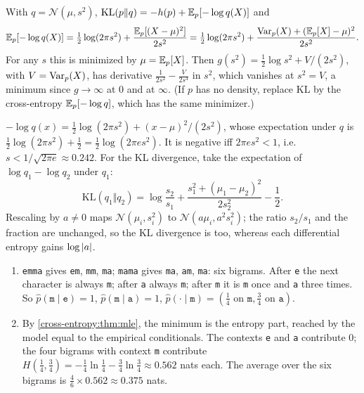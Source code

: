 With $q = \mathcal N(\mu, s^2)$, $\mathrm{KL}(p\Vert q) = -h(p) + \mathbb{E}_p[-\log q(X)]$ and
\[
  \mathbb{E}_p[-\log q(X)] = \tfrac12\log(2\pi s^2) + \frac{\mathbb{E}_p[(X - \mu)^2]}{2s^2}
  = \tfrac12\log(2\pi s^2) + \frac{\operatorname{Var}_p(X) + (\mathbb{E}_p[X] - \mu)^2}{2s^2}.
\]
For any $s$ this is minimized by $\mu = \mathbb{E}_p[X]$. Then $g(s^2) = \frac12\log s^2 + V/(2s^2)$, with $V = \operatorname{Var}_p(X)$, has
derivative $\frac1{2s^2} - \frac V{2s^4}$ in $s^2$, which vanishes at $s^2 = V$, a minimum since $g\to\infty$ at $0$ and
at $\infty$. (If $p$ has no density, replace $\mathrm{KL}$ by the cross-entropy $\mathbb{E}_p[-\log q]$, which has the
same minimizer.)

$-\log q(x) = \frac12\log(2\pi s^2) + (x - \mu)^2/(2s^2)$, whose expectation under $q$ is
$\frac12\log(2\pi s^2) + \frac12 = \frac12\log(2\pi es^2)$. It is negative iff $2\pi es^2<1$, i.e.\
$s<1/\sqrt{2\pi e}\approx0.242$. For the KL divergence, take the expectation of
$\log q_1 - \log q_2$ under $q_1$:
\[
  \mathrm{KL}(q_1\Vert q_2) = \log\frac{s_2}{s_1} + \frac{s_1^2 + (\mu_1 - \mu_2)^2}{2s_2^2} - \frac12 .
\]
Rescaling by $a\neq0$ maps $\mathcal N(\mu_i, s_i^2)$ to $\mathcal N(a\mu_i, a^2s_i^2)$; the ratio $s_2/s_1$ and the fraction are
unchanged, so the KL divergence is too, whereas each differential entropy gains $\log\left|a\right|$.

\begin{enumerate}[nosep]
  \item \texttt{emma} gives \texttt{em}, \texttt{mm}, \texttt{ma}; \texttt{mama} gives \texttt{ma}, \texttt{am},
        \texttt{ma}: six bigrams. After \texttt e the next character is always \texttt m; after
        \texttt a always \texttt m; after \texttt m it is \texttt m once and \texttt a three times. So
        $\hat p(\texttt m\mid\texttt e) = 1$, $\hat p(\texttt m\mid\texttt a) = 1$, $\hat p(\cdot\mid\texttt m) = (\frac14\text{ on }\texttt m, \frac34\text{ on }\texttt a)$.
  \item By \cref{cross-entropy:thm:mle}, the minimum is the entropy part, reached by the
        model equal to the empirical conditionals. The contexts \texttt e and \texttt a
        contribute $0$; the four bigrams with context \texttt m contribute
        $H(\frac14,\frac34) = -\frac14\ln\frac14 - \frac34\ln\frac34\approx0.562$ nats each. The average over the six bigrams is
        $\frac46\times0.562\approx0.375$ nats.
\end{enumerate}

\section{}

